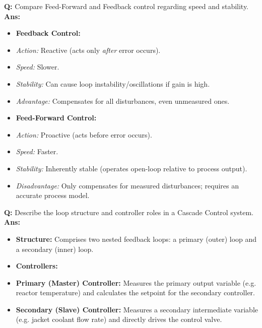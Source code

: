 \documentclass[10pt,a4paper,twocolumn]{article}
\begin{document}
\begin{tcolorbox}[
  colback=white,
  colframe=UnitColorFour,
  colbacktitle=gray!10!white,
  coltitle=black,
  fonttitle=\bfseries\sffamily\small,
  title={Unit IV $\bullet$ Card 2: Feed-Forward vs. Feedback Control},
  boxrule=1.2pt,
  arc=2mm,
  outer arc=2mm,
  boxsep=1.5mm,
  top=1mm,
  bottom=1mm,
  left=1.5mm,
  right=1.5mm,
  before skip=2.5mm,
  after skip=2.5mm
]
\textbf{Q:} Compare Feed-Forward and Feedback control regarding speed and stability.
\tcbline
\textbf{Ans:} \begin{itemize}
  \item   \textbf{Feedback Control:}
  \item   \textit{Action:} Reactive (acts only \textit{after} error occurs).
  \item   \textit{Speed:} Slower.
  \item   \textit{Stability:} Can cause loop instability/oscillations if gain is high.
  \item   \textit{Advantage:} Compensates for all disturbances, even unmeasured ones.
  \item   \textbf{Feed-Forward Control:}
  \item   \textit{Action:} Proactive (acts before error occurs).
  \item   \textit{Speed:} Faster.
  \item   \textit{Stability:} Inherently stable (operates open-loop relative to process output).
  \item   \textit{Disadvantage:} Only compensates for measured disturbances; requires an accurate process model.
\end{itemize}
\end{tcolorbox}


\begin{tcolorbox}[
  colback=white,
  colframe=UnitColorFour,
  colbacktitle=gray!10!white,
  coltitle=black,
  fonttitle=\bfseries\sffamily\small,
  title={Unit IV $\bullet$ Card 3: Cascade Control Architecture},
  boxrule=1.2pt,
  arc=2mm,
  outer arc=2mm,
  boxsep=1.5mm,
  top=1mm,
  bottom=1mm,
  left=1.5mm,
  right=1.5mm,
  before skip=2.5mm,
  after skip=2.5mm
]
\textbf{Q:} Describe the loop structure and controller roles in a Cascade Control system.
\tcbline
\textbf{Ans:} \begin{itemize}
  \item   \textbf{Structure:} Comprises two nested feedback loops: a primary (outer) loop and a secondary (inner) loop.
  \item   \textbf{Controllers:}
  \item   \textbf{Primary (Master) Controller:} Measures the primary output variable (e.g. reactor temperature) and calculates the setpoint for the secondary controller.
  \item   \textbf{Secondary (Slave) Controller:} Measures a secondary intermediate variable (e.g. jacket coolant flow rate) and directly drives the control valve.
\end{itemize}
\end{tcolorbox}
\end{document}
